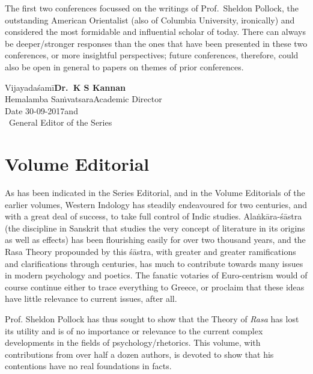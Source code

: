The first two conferences focussed on the writings of Prof.\ Sheldon Pollock, the outstanding American Orientalist (also of Columbia University, ironically) and considered the most formidable and influential scholar of today. There can always be deeper/stronger responses than the ones that have been presented in these two conferences, or more insightful perspectives; future conferences, therefore, could also be open in general to papers on themes of prior conferences.
\bigskip

\noindent
Vijayadaśamī\hfill	{\bf Dr.~K S Kannan}\\
Hemalamba Saṁvatsara\hfill Academic Director\\
Date 30-09-2017\hfill and\\	
\phantom{.}~\hfill General Editor of the Series
            

\chapter*{Volume Editorial}\label{editorial}

\vskip 9pt



As has been indicated in the Series Editorial, and in the Volume Editorials of the earlier volumes, Western Indology has steadily endeavoured for two centuries, and with a great deal of success, to take full control of Indic studies. Alaṅkāra-śāstra (the discipline in Sanskrit that studies the very concept of literature in its origins as well as effects) has been flourishing easily for over two thousand years, and the Rasa Theory propounded by this śāstra, with greater and greater ramifications and clarifications through centuries, has much to contribute towards many issues in modern psychology and poetics. The fanatic votaries of Euro-centrism would of course continue either to trace everything to Greece, or proclaim that these ideas have little relevance to current issues, after all.

Prof. Sheldon Pollock has thus sought to show that the Theory of \textsl{Rasa} has lost its utility and is of no importance or relevance to the current complex developments in the fields of psychology/rhetorics. This volume, with contributions from over half a dozen authors, is devoted to show that his contentions have no real foundations in facts.

